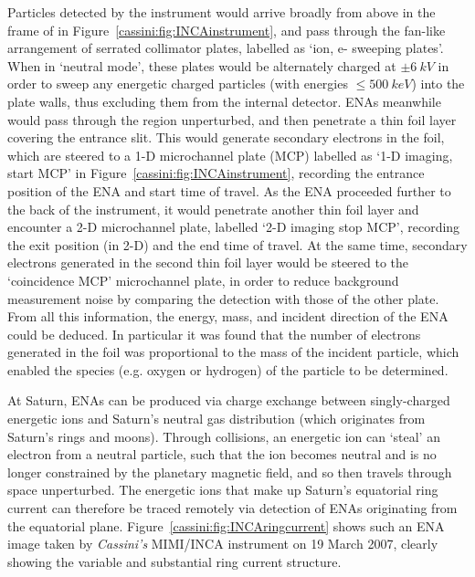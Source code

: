 Particles detected by the instrument would arrive broadly from above in the frame of  in Figure~\ref{cassini:fig:INCAinstrument}, and pass through the fan-like arrangement of serrated collimator plates, labelled as `ion, e- sweeping plates'. When in `neutral mode', these plates would be alternately charged at $\pm\SI{6}{kV}$ in order to sweep any energetic charged particles (with energies $\leq \SI{500}{keV}$) into the plate walls, thus excluding them from the internal detector. ENAs meanwhile would pass through the region unperturbed, and then penetrate a thin foil layer covering  the entrance slit. This would generate secondary electrons in the foil, which are steered to a 1-D microchannel plate (MCP) labelled as `1-D imaging, start MCP' in  Figure~\ref{cassini:fig:INCAinstrument}, recording the entrance position of the ENA and start time of travel. As the ENA proceeded further to the back of the instrument, it would penetrate another thin foil layer and  encounter a 2-D microchannel plate, labelled `2-D imaging stop MCP', recording the exit position (in 2-D) and the end time of travel. At the same time, secondary electrons generated in the second thin foil layer would be steered to the `coincidence MCP' microchannel plate, in order to reduce background measurement noise by comparing the detection with those of the other plate. From all this information, the energy, mass, and incident direction of the ENA could be deduced. In particular it was found that the number of electrons generated in the foil was proportional to the mass of  the incident particle, which enabled the species (e.g. oxygen or hydrogen) of the particle to be determined.

At Saturn, ENAs can be produced via charge exchange between singly-charged energetic ions and Saturn's neutral gas distribution (which originates from Saturn's rings and moons). Through collisions, an energetic ion can `steal' an electron from a neutral particle, such that the ion becomes neutral and is no longer constrained by the planetary magnetic field, and so then travels through space unperturbed. The energetic ions that make up Saturn's equatorial ring current can therefore be traced remotely via detection of ENAs originating from the equatorial plane. Figure~\ref{cassini:fig:INCAringcurrent} shows such an ENA image taken by \textit{Cassini's} MIMI/INCA instrument  on 19 March 2007, clearly showing the variable and substantial ring current structure. 

